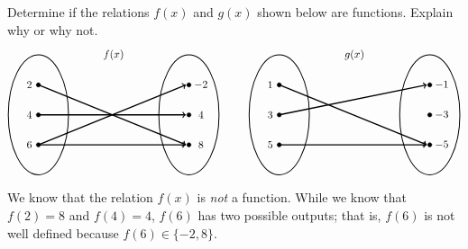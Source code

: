 \documentclass[11pt,letterpaper]{article}
\begin{document}

 Determine if the relations $f(x)$ and $g(x)$ shown below are functions. Explain why or why not. 
	\[
	\begin{tikzpicture}
	\node at (2.5,2) {$f(x)$};
	\draw[line width=0.03cm] (0,0) circle (1 and 2);
	\draw[line width=0.03cm] (5,0) circle (1 and 2);
	
	\draw[fill=black] (0,1) circle (0.07);
	\draw[fill=black] (0,0) circle (0.07);
	\draw[fill=black] (0,-1) circle (0.07);
	
	\draw[fill=black] (5,1) circle (0.07);
	\draw[fill=black] (5,0) circle (0.07);
	\draw[fill=black] (5,-1) circle (0.07);
	
	\draw[line width=0.04cm,->] (0,1) -- (4.9,-1);
	\draw[line width=0.04cm,->] (0,0) -- (4.9,0);
	\draw[line width=0.04cm,->] (0,-1) -- (4.9,1);
	\draw[line width=0.04cm,->] (0,-1) -- (4.9,-1);
	
	\node at (-0.3,1) {$2$};
	\node at (-0.3,0) {$4$};
	\node at (-0.3,-1) {$6$};
	
	\node at (5.4,1) {$-2$};
	\node at (5.4,0) {$4$};
	\node at (5.4,-1) {$8$};
	
	\tikzset{shift={(8,0)}}
	\node at (2.5,2) {$g(x)$};
	\draw[line width=0.03cm] (0,0) circle (1 and 2);
	\draw[line width=0.03cm] (5,0) circle (1 and 2);
	
	\draw[fill=black] (0,1) circle (0.07);
	\draw[fill=black] (0,0) circle (0.07);
	\draw[fill=black] (0,-1) circle (0.07);
	
	\draw[fill=black] (5,1) circle (0.07);
	\draw[fill=black] (5,0) circle (0.07);
	\draw[fill=black] (5,-1) circle (0.07);
	
	\draw[line width=0.04cm,->] (0,1) -- (4.9,-1);
	\draw[line width=0.04cm,->] (0,0) -- (4.9,1);
	\draw[line width=0.04cm,->] (0,-1) -- (4.9,-1);
	
	\node at (-0.3,1) {$1$};
	\node at (-0.3,0) {$3$};
	\node at (-0.3,-1) {$5$};
	
	\node at (5.4,1) {$-1$};
	\node at (5.4,0) {$-3$};
	\node at (5.4,-1) {$-5$};
	\end{tikzpicture}
	\] \pspace

\sol We know that the relation $f(x)$ is \textit{not} a function. While we know that $f(2)= 8$ and $f(4)= 4$, $f(6)$ has two possible outputs; that is, $f(6)$ is not well defined because $f(6) \in \{ -2, 8 \}$. \pspace
\end{document}

